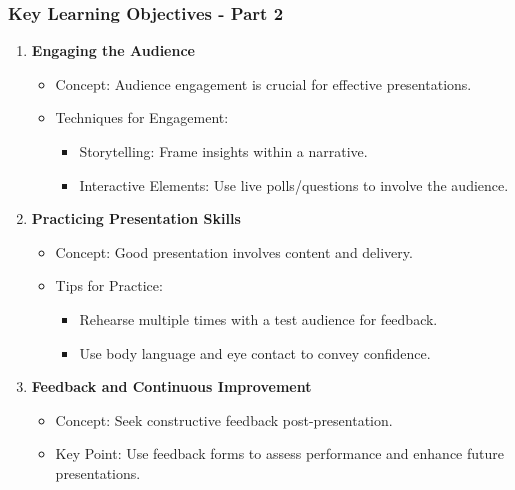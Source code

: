 \documentclass[aspectratio=169]{beamer}
\begin{document}
\begin{frame}[fragile]
    \frametitle{Key Learning Objectives - Part 2}
    \begin{enumerate}[resume]
        \item \textbf{Engaging the Audience}
            \begin{itemize}
                \item Concept: Audience engagement is crucial for effective presentations.
                \item Techniques for Engagement:
                    \begin{itemize}
                        \item Storytelling: Frame insights within a narrative.
                        \item Interactive Elements: Use live polls/questions to involve the audience.
                    \end{itemize}
            \end{itemize}
        
        \item \textbf{Practicing Presentation Skills}
            \begin{itemize}
                \item Concept: Good presentation involves content and delivery.
                \item Tips for Practice:
                    \begin{itemize}
                        \item Rehearse multiple times with a test audience for feedback.
                        \item Use body language and eye contact to convey confidence.
                    \end{itemize}
            \end{itemize}

        \item \textbf{Feedback and Continuous Improvement}
            \begin{itemize}
                \item Concept: Seek constructive feedback post-presentation.
                \item Key Point: Use feedback forms to assess performance and enhance future presentations.
            \end{itemize}
    \end{enumerate}
\end{frame}
\end{document}

